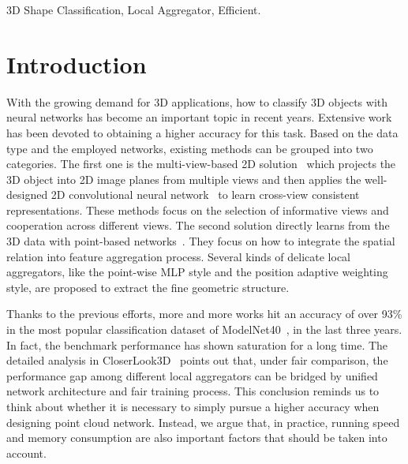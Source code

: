\documentclass[journal]{IEEEtran}
\begin{document}
\begin{IEEEkeywords}
3D Shape Classification, Local Aggregator, Efficient.
\end{IEEEkeywords}

\section{Introduction}


With the growing demand for 3D applications, how to classify 3D objects with neural networks has become an important topic in recent years. Extensive work has been devoted to obtaining a higher accuracy for this task. Based on the data type and the employed networks, existing methods can be grouped into two categories. The first one is the multi-view-based 2D solution~\cite{mvcnn,mvc1,mvc2} which projects the 3D object into 2D image planes from multiple views and then applies the well-designed 2D convolutional neural network~\cite{alexnet,resnet,vgg} to learn cross-view consistent representations. These methods focus on the selection of informative views and cooperation across different views. The second solution directly learns from the 3D data with point-based networks~\cite{PointNet,PointNet++}. They focus on how to integrate the spatial relation into feature aggregation process. Several kinds of delicate local aggregators, like the point-wise MLP style and the position adaptive weighting style, are proposed to extract the fine geometric structure.


Thanks to the previous efforts, more and more works hit an accuracy of over 93\% in the most popular classification dataset of ModelNet40~\cite{wu20153d}, in the last three years. In fact, the benchmark performance has shown saturation for a long time. The detailed analysis in CloserLook3D~\cite{closerlook3d} points out that, under fair comparison, the performance gap among different local aggregators can be bridged by unified network architecture and fair training process. This conclusion reminds us to think about whether it is necessary to simply pursue a higher accuracy when designing point cloud network. Instead, we argue that, in practice, running speed and memory consumption are also important factors that should be taken into account. 
\end{document}
